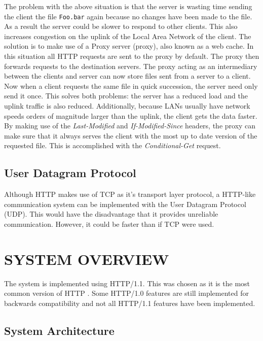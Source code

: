\documentclass[10pt,twocolumn]{witseiepaper}
\begin{document}
	The problem with the above situation is that the server is wasting time sending the client the file \texttt{Foo.bar} again because no changes have been made to the file. As a result the server could be slower to respond to other clients. This also increases congestion on the uplink of the Local Area Network of the client. The solution is to make use of a Proxy server (proxy), also known as a web cache. In this situation all HTTP requests are sent to the proxy by default. The proxy then forwards requests to the destination servers. The proxy acting as an intermediary between the clients and server can now store files sent from a server to a client. Now when a client requests the same file in quick succession, the server need only send it once. This solves both problems: the server has a reduced load and the uplink traffic is also reduced. Additionally, because LANs usually have network speeds orders of magnitude larger than the uplink, the client gets the data faster. By making use of the \emph{Last-Modified} and \emph{If-Modified-Since} headers, the proxy can make sure that it always serves the client with the most up to date version of the requested file. This is accomplished with the \emph{Conditional-Get} request. 	

	\subsection{User Datagram Protocol}

	Although HTTP makes use of TCP as it's transport layer protocol, a HTTP-like communication system can be implemented with the User Datagram Protocol (UDP). This would have the disadvantage that it provides unreliable communication. However, it could be faster than if TCP were used.

\section{SYSTEM OVERVIEW} \label{sysover}

The system is implemented using HTTP/1.1. This was chosen as it is the most common version of HTTP \cite{}. Some HTTP/1.0 features are still implemented for backwards compatibility and not all HTTP/1.1 features have been implemented.

	\subsection{System Architecture}
\end{document}
